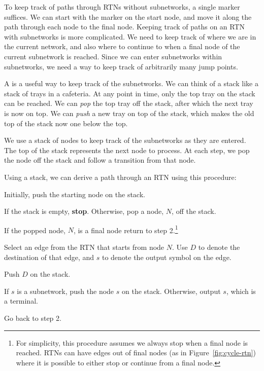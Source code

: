 To keep track of paths through RTNs without subnetworks, a single marker suffices.  We can start with the marker on the start node, and move it along the path through each node to the final node.  Keeping track of paths on an RTN with subnetworks is more complicated.  We need to keep track of where we are in the current network, and also where to continue to when a final node of the current subnetwork is reached.  Since we can enter subnetworks within subnetworks, we need a way to keep track of arbitrarily many jump points.

A  is a useful way to keep track of the subnetworks.  We can think of a stack like a stack of trays in a cafeteria.  At any point in time, only the top tray on the stack can be reached.  We can \emph{pop} the top tray off the stack, after which the next tray is now on top.  We can \emph{push} a new tray on top of the stack, which makes the old top of the stack now one below the top. 

We use a stack of nodes to keep track of the subnetworks as they are entered.  The top of the stack represents the next node to process.  At each step, we pop the node off the stack and follow a transition from that node.  

Using a stack, we can derive a path through an RTN using this procedure:
\begin{enumtight}
\item Initially, push the starting node on the stack.
\item If the stack is empty, {\bf stop}.  Otherwise, pop a node, $N$, off the stack.  
\item If the popped node, $N$, is a final node return to step 2.\footnote{For simplicity, this procedure assumes we always stop when a final node is reached.  RTNs can have edges out of final nodes (as in Figure~\ref{fig:cycle-rtn}) where it is possible to either stop or continue from a final node.}
\item Select an edge from the RTN that starts from node $N$.  Use $D$ to denote the destination of that edge, and $s$ to denote the output symbol on the edge.
\item Push $D$ on the stack. %
\item If $s$ is a subnetwork, push the node $s$ on the stack.  Otherwise, output $s$, which is a terminal.
\item Go back to step 2. %
\end{enumtight}

